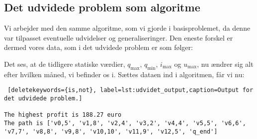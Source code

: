 \subsection{Det udvidede problem som algoritme}
Vi arbejder med den samme algoritme, som vi gjorde i basisproblemet, da denne var tilpasset eventuelle udvidelser og generaliseringer. Den eneste forskel er dermed vores data, som i det udvidede problem er som følger:

 

Det ses, at de tidligere statiske værdier, $q_{\max}$, $q_{\min}$, $i_{\max}$ og $u_{\max}$, nu ændrer sig alt efter hvilken måned, vi befinder os i. Sættes dataen ind i algoritmen, får vi nu:


\begin{lstlisting} [deletekeywords={is,not}, label=lst:udvidet_output,caption=Output for det udvidede problem.]

The highest profit is 188.27 euro
The path is ['v0,5', 'v1,8', 'v2,4', 'v3,2', 'v4,4', 'v5,5', 'v6,6', 'v7,7', 'v8,8', 'v9,8', 'v10,10', 'v11,9', 'v12,5', 'q_end']

\end{lstlisting}